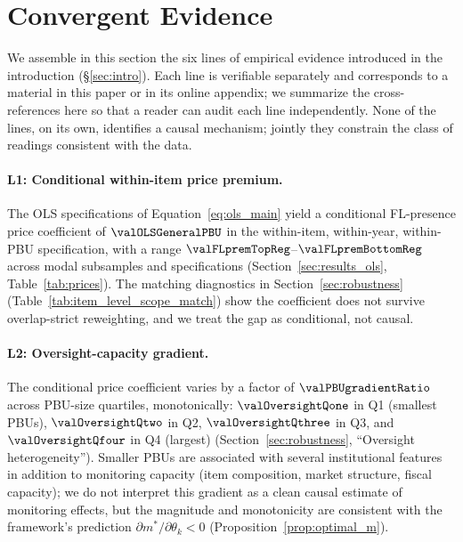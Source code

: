 
\section{Convergent Evidence}
\label{sec:convergent_evidence}

We assemble in this section the six lines of empirical evidence
introduced in the introduction (\S\ref{sec:intro}). Each line is
verifiable separately and corresponds to a material in this paper or
in its online appendix; we summarize the cross-references here so
that a reader can audit each line independently. None of the lines,
on its own, identifies a causal mechanism; jointly they constrain the
class of readings consistent with the data.

\paragraph{L1: Conditional within-item price premium.}
The OLS specifications of Equation~\eqref{eq:ols_main} yield a
conditional FL-presence price coefficient of $\valOLSGeneralPBU$ in
the within-item, within-year, within-PBU specification, with a
range $\valFLpremTopReg$--$\valFLpremBottomReg$ across modal
subsamples and specifications (Section~\ref{sec:results_ols},
Table~\ref{tab:prices}). The matching diagnostics in
Section~\ref{sec:robustness} (Table~\ref{tab:item_level_scope_match})
show the coefficient does not survive overlap-strict reweighting,
and we treat the gap as conditional, not causal.

\paragraph{L2: Oversight-capacity gradient.}
The conditional price coefficient varies by a factor of $\valPBUgradientRatio$
across PBU-size quartiles, monotonically: $\valOversightQone$ in Q1
(smallest PBUs), $\valOversightQtwo$ in Q2, $\valOversightQthree$ in
Q3, and $\valOversightQfour$ in Q4 (largest)
(Section~\ref{sec:robustness}, ``Oversight heterogeneity'').
Smaller PBUs are associated with several institutional features in
addition to monitoring capacity (item composition, market structure,
fiscal capacity); we do not interpret this gradient as a clean
causal estimate of monitoring effects, but the magnitude and
monotonicity are consistent with the framework's prediction
$\partial m^*/\partial \theta_k < 0$
(Proposition~\ref{prop:optimal_m}).

